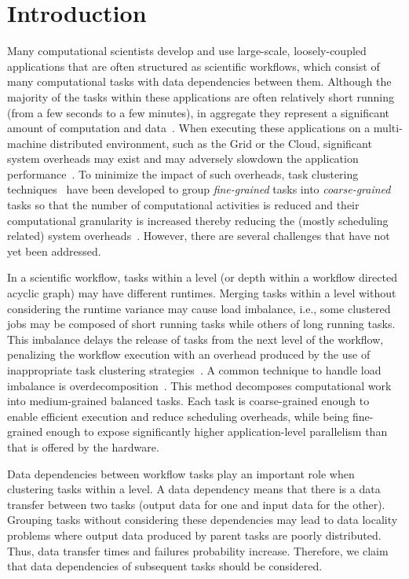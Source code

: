 
\section{Introduction}
\label{intro}
Many computational scientists develop and use large-scale, loosely-coupled applications that are often structured as scientific workflows, which consist of many computational tasks with data dependencies between them. Although the majority of the tasks within these applications are often relatively short running (from a few seconds to a few minutes), in aggregate they represent a significant amount of computation and data~\cite{Juve2013682,daSilva:2013:TFO:2534248.2534254}. When executing these applications on a multi-machine distributed environment, such as the Grid or the Cloud, significant system overheads may exist and may adversely slowdown the application performance~\cite{Chen2011}. To minimize the impact of such overheads, task clustering techniques~\cite{Muthuvelu:2005:DJG:1082290.1082297,4493929,Muthuvelu2010,Muthuvelu2013170,keat-2006,ang-2009,Liu2009,Singh:2008:WTC:1341811.1341822,Ferreira-granularity-2013} have been developed to group \emph{fine-grained} tasks into \emph{coarse-grained} tasks so that the number of computational activities is reduced and their computational granularity is increased thereby reducing the (mostly scheduling related) system overheads~\cite{Chen2011}.
However, there are several challenges that have not yet been addressed.

In a scientific workflow, tasks within a level (or depth within a workflow directed acyclic graph) may have different runtimes. Merging tasks within a level without considering the runtime variance may cause load imbalance, i.e., some clustered jobs may be composed of short running tasks while others of long running tasks. This imbalance delays the release of tasks from the next level of the workflow, penalizing the workflow execution with an overhead produced by the use of inappropriate task clustering strategies~\cite{Chen2013}.
A common technique to handle load imbalance is overdecomposition~\cite{Lifflander}.
This method decomposes computational work into medium-grained balanced tasks. Each task is coarse-grained enough to enable efficient execution and reduce scheduling overheads, while being fine-grained enough to expose significantly higher application-level parallelism than that is offered by the hardware. 

Data dependencies between workflow tasks play an important role when clustering tasks within a level. A data dependency means that there is a data transfer between two tasks (output data for one and input data for the other). Grouping tasks without considering these dependencies may lead to data locality problems where output data produced by parent tasks are poorly distributed. Thus, data transfer times and failures probability increase.
Therefore, we claim that data dependencies of subsequent tasks should be considered.

